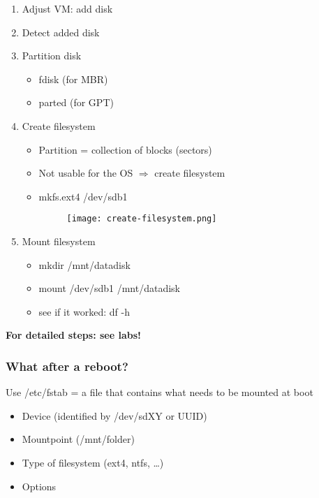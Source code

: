 \documentclass{article}
\begin{document}
\begin{enumerate}
    \item Adjust VM: add disk
    \item Detect added disk
    \item Partition disk
    \begin{itemize}
        \item fdisk (for MBR)
        \item parted (for GPT)
    \end{itemize}
    \item Create filesystem
    \begin{itemize}
        \item Partition = collection of blocks (sectors)
        \item Not usable for the OS $\Rightarrow$ create filesystem
        \item mkfs.ext4 /dev/sdb1
        \begin{figure}[H]
            \centering
            \texttt{[image: create-filesystem.png]}
        \end{figure}
    \end{itemize}
    \item Mount filesystem
    \begin{itemize}
        \item mkdir /mnt/datadisk
        \item mount /dev/sdb1 /mnt/datadisk
        \item see if it worked: df -h
    \end{itemize}
\end{enumerate}

\textbf{For detailed steps: see labs!}


\subsubsection{What after a reboot?}

Use /etc/fstab = a file that contains what needs to be mounted at boot

\begin{itemize}
    \item Device (identified by /dev/sdXY or UUID) 
    \item Mountpoint (/mnt/folder)
    \item Type of filesystem (ext4, ntfs, \dots)
    \item Options
\end{itemize}
\end{document}

